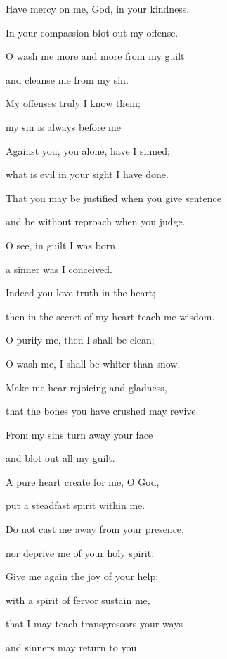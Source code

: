 \noindent Have mercy on me, God, in your kindness.~\GreStar{}~\nopagebreak

In your compassion blot out my offense.

\noindent O wash me more and more from my guilt~\GreStar{}~\nopagebreak

and cleanse me from my sin.

\noindent My offenses truly I know them;~\GreStar{}~\nopagebreak

my sin is always before me

\noindent Against you, you alone, have I sinned;~\GreStar{}~\nopagebreak

what is evil in your sight I have done.

\noindent That you may be justified when you give sentence~\GreStar{}~\nopagebreak

and be without reproach when you judge.

\noindent O see, in guilt I was born,~\GreStar{}~\nopagebreak

a sinner was I conceived.

\noindent Indeed you love truth in the heart;~\GreStar{}~\nopagebreak

then in the secret of my heart teach me wisdom.

\noindent O purify me, then I shall be clean;~\GreStar{}~\nopagebreak

O wash me, I shall be whiter than snow.

\noindent Make me hear rejoicing and gladness,~\GreStar{}~\nopagebreak

that the bones you have crushed may revive.

\noindent From my sins turn away your face~\GreStar{}~\nopagebreak

and blot out all my guilt.

\noindent A pure heart create for me, O God,~\GreStar{}~\nopagebreak

put a steadfast spirit within me.

\noindent Do not cast me away from your presence,~\GreStar{}~\nopagebreak

nor deprive me of your holy spirit.

\noindent Give me again the joy of your help;~\GreStar{}~\nopagebreak

with a spirit of fervor sustain me,

\noindent that I may teach transgressors your ways~\GreStar{}~\nopagebreak

and sinners may return to you.

